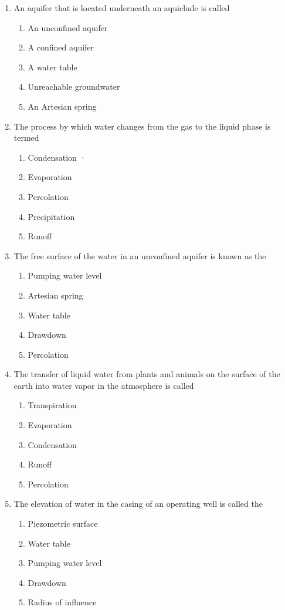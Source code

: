 \documentclass{article}
\begin{document}
\begin{enumerate}
\item An aquifer that is located underneath an aquiclude is called
\begin{enumerate}
\item An unconfined aquifer
\item A confined aquifer
\item A water table
\item Unreachable groundwater
\item An Artesian spring
\end{enumerate}

\item The process by which water changes from the gas to the liquid phase is termed
\begin{enumerate}
\item Condensation	·
\item Evaporation
\item Percolation
\item Precipitation
\item Runoff
\end{enumerate}

\item The free surface of the water in an unconfined aquifer is known as the
\begin{enumerate}
\item Pumping water level
\item Artesian spring
\item Water table
\item Drawdown
\item Percolation
\end{enumerate}

\item The transfer of liquid water from plants and animals on the surface of the earth into water vapor in the atmosphere is called
\begin{enumerate}
\item Transpiration
\item Evaporation
\item Condensation
\item Runoff
\item Percolation
\end{enumerate}

\item The elevation of water in the casing of an operating well is called the
\begin{enumerate}
\item Piezometric surface
\item Water table
\item Pumping water level
\item Drawdown
\item Radius of influence
\end{enumerate}


\end{enumerate}
\end{document}
